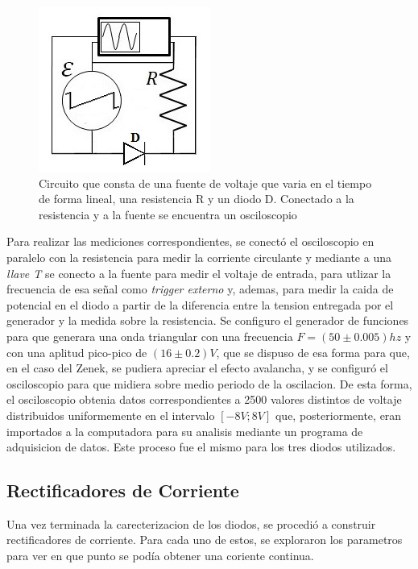 \documentclass[11pt,a4paper]{article}
\begin{document}
\begin{figure}[H]
\centering
\includegraphics[scale=0.8]{Caracterizar-Diodo}
   \caption{Circuito que consta de una fuente de voltaje que varia en el tiempo de forma lineal, una resistencia R y un diodo D. Conectado a la resistencia y a la fuente se encuentra un osciloscopio}
   \label{fig:Car-Dio}
\end{figure}

Para realizar las mediciones correspondientes, se conectó el osciloscopio en paralelo con la resistencia para medir la corriente circulante y mediante a una \textit{llave T} se conecto a la fuente para medir el voltaje de entrada, para utlizar la frecuencia de esa señal como \textit{trigger externo} y, ademas, para medir la caida de potencial en el diodo a partir de la diferencia entre la tension entregada por el generador y la medida sobre la resistencia. Se configuro el generador de funciones para que generara una onda triangular con una frecuencia  $F = (50 \pm 0.005)hz$ y con una aplitud pico-pico de $(16 \pm 0.2)V$, que se dispuso de esa forma para que, en el caso del Zenek, se pudiera apreciar el efecto avalancha, y se configuró el osciloscopio para que midiera sobre medio periodo de la oscilacion. De esta forma, el osciloscopio obtenia datos correspondientes a 2500 valores distintos de voltaje distribuidos uniformemente en el intervalo $[-8V;8V]$ que, posteriormente, eran importados a la computadora para su analisis  mediante un programa de adquisicion de datos. Este proceso fue el mismo para los tres diodos utilizados.

\subsection{Rectificadores de Corriente}
Una vez terminada la carecterizacion de los diodos, se procedió a construir rectificadores de corriente. Para cada uno de estos, se exploraron los parametros para ver en que punto se podía obtener una coriente continua.
\end{document}
